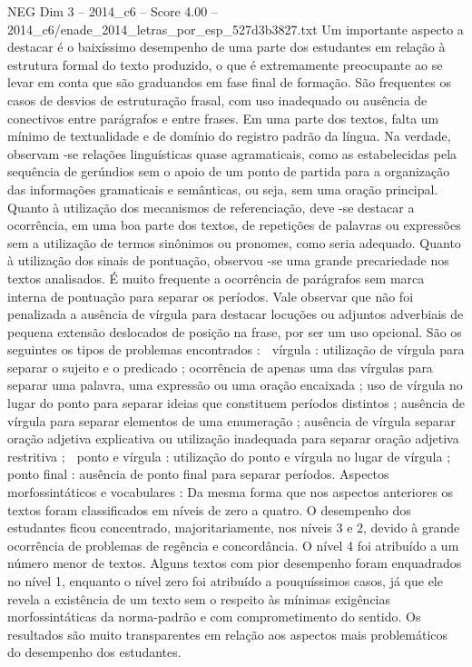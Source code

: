 \begin{textsample}{NEG Dim 3 – 2014\_c6 – Score 4.00 – 2014\_c6/enade\_2014\_letras\_por\_esp\_527d3b3827.txt}
Um importante aspecto a destacar é o baixíssimo desempenho de uma parte dos estudantes em relação à estrutura formal do texto produzido, o que é extremamente preocupante ao se levar em conta que são graduandos em fase final de formação.
São frequentes os casos de desvios de estruturação frasal, com uso inadequado ou ausência de conectivos entre parágrafos e entre frases.
Em uma parte dos textos, falta um mínimo de textualidade e de domínio do registro padrão da língua.
Na verdade, observam -se relações linguísticas quase agramaticais, como as estabelecidas pela sequência de gerúndios sem o apoio de um ponto de partida para a organização das informações gramaticais e semânticas, ou seja, sem uma oração principal.
Quanto à utilização dos mecanismos de referenciação, deve -se destacar a ocorrência, em uma boa parte dos textos, de repetições de palavras ou expressões sem a utilização de termos sinônimos ou pronomes, como seria adequado.
Quanto à utilização dos sinais de pontuação, observou -se uma grande precariedade nos textos analisados.
É muito frequente a ocorrência de parágrafos sem marca interna de pontuação para separar os períodos.
Vale observar que não foi penalizada a ausência de vírgula para destacar locuções ou adjuntos adverbiais de pequena extensão deslocados de posição na frase, por ser um uso opcional.
São os seguintes os tipos de problemas encontrados :  vírgula : utilização de vírgula para separar o sujeito e o predicado ; ocorrência de apenas uma das vírgulas para separar uma palavra, uma expressão ou uma oração encaixada ; uso de vírgula no lugar do ponto para separar ideias que constituem períodos distintos ; ausência de vírgula para separar elementos de uma enumeração ; ausência de vírgula separar oração adjetiva explicativa ou utilização inadequada para separar oração adjetiva restritiva ;  ponto e vírgula : utilização do ponto e vírgula no lugar de vírgula ;  ponto final : ausência de ponto final para separar períodos.
Aspectos morfossintáticos e vocabulares : Da mesma forma que nos aspectos anteriores os textos foram classificados em níveis de zero a quatro.
O desempenho dos estudantes ficou concentrado, majoritariamente, nos níveis 3 e 2, devido à grande ocorrência de problemas de regência e concordância.
O nível 4 foi atribuído a um número menor de textos.
Alguns textos com pior desempenho foram enquadrados no nível 1, enquanto o nível zero foi atribuído a pouquíssimos casos, já que ele revela a existência de um texto sem o respeito às mínimas exigências morfossintáticas da norma-padrão e com comprometimento do sentido.
Os resultados são muito transparentes em relação aos aspectos mais problemáticos do desempenho dos estudantes.

\end{textsample}
